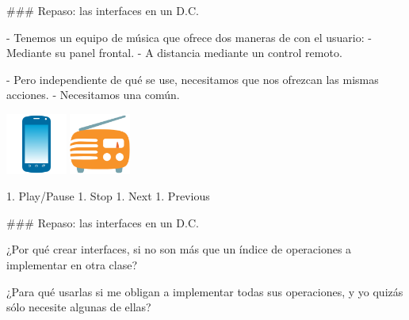 

\columnsend

### Repaso: las interfaces en un D.C.


- Tenemos un equipo de música que ofrece dos maneras de  con
el usuario:
    - Mediante su panel frontal.
    - A distancia mediante un control remoto.

- Pero independiente de qué se use, necesitamos que nos ofrezcan las mismas acciones.
    - Necesitamos una  común.

\columnsbegin
{}
\centering\includegraphics[width=20mm]{icons/554-emoji_android_mobile_phone.png}
\centering\includegraphics[width=20mm]{icons/562-emoji_android_radio.png}

\vspace{-5em}
1. Play/Pause
1. Stop
1. Next
1. Previous

\columnsend

### Repaso: las interfaces en un D.C.


\begin{rboxx}[.9\textwidth]{}
¿Por qué crear interfaces, si no son más que un índice de operaciones a implementar en otra clase?
\end{rboxx}

\begin{rboxx}[.9\textwidth]{}
¿Para qué usarlas si me obligan a implementar todas sus operaciones, y yo quizás sólo necesite algunas de ellas?
\end{rboxx}

